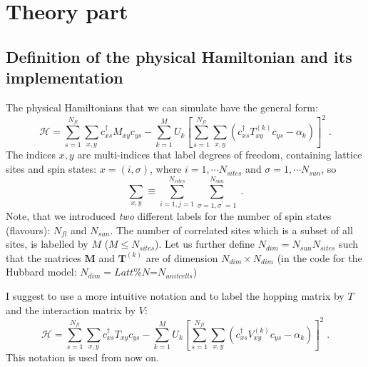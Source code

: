 \section{Theory part}


\subsection{Definition of the physical Hamiltonian and its implementation}

The physical Hamiltonians that we can simulate have the general form:
\begin{equation}
\label{eqn_general_ham1}
\mathcal{H}
=\sum\limits_{s=1}^{N_{fl}}\sum\limits_{x,y}
c^{\dagger}_{x s}M_{xy}c^{\phantom\dagger}_{ys}
-\sum\limits_{k=1}^{M}U_{k}\left[
\sum\limits_{s=1}^{N_{fl}}\sum\limits_{x,y}
\left( 
c^{\dagger}_{xs}T^{(k)}_{xy}c^{\phantom\dagger}_{ys}-\alpha_{k}
\right)
\right]^{2}\;.
\end{equation}
The indices $x,y$ are multi-indices that label degrees of freedom, containing lattice sites and spin states: $x=(i,\sigma)$, 
where $i=1,\cdots N_{sites}$ and $\sigma=1,\cdots N_{sun}$, so
\begin{equation}
\sum\limits_{x,y}\equiv
\sum\limits_{i=1,j=1}^{N_{sites}}\sum\limits_{\sigma=1,\sigma^{\prime}=1}^{N_{sun}}\;.
\end{equation}
Note, that  we introduced \textit{two} different labels for the number of spin states (flavours): 
$N_{fl}$ and $N_{sun}$.
The number of correlated sites which is a subset of all sites, is labelled by $M$  ($M\leq N_{sites}$).
Let us further define  $N_{dim}=N_{sun} N_{sites}$ such that the matrices $\bm{M}$ and $\bm{T}^{(k)}$ are of dimension $N_{dim}\times N_{dim}$ 
(in the code for the Hubbard model: $N_{dim}=Latt\%N$=$N_{unitcells}$)

I suggest to use a more intuitive notation and to label the hopping matrix by $T$ and the interaction matrix by $V$:
\begin{equation}
\label{eqn_general_ham2}
\mathcal{H}
=\sum\limits_{s=1}^{N_{fl}}\sum\limits_{x,y}
c^{\dagger}_{xs}T_{xy}c^{\phantom\dagger}_{ys}
-\sum\limits_{k=1}^{M}U_{k}\left[
\sum\limits_{s=1}^{N_{fl}}\sum\limits_{x,y}
\left( 
c^{\dagger}_{xs}V^{(k)}_{xy}c^{\phantom\dagger}_{y s}-\alpha_{k}
\right)
\right]^{2}\;.
\end{equation}
This notation is used from now on.

